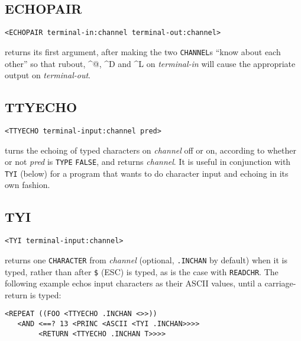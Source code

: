 \documentclass[a4paper]{scrbook}
\begin{document}
\subsection{ECHOPAIR}\label{echopair}

\begin{verbatim}
<ECHOPAIR terminal-in:channel terminal-out:channel>
\end{verbatim}

 returns its first argument, after making the two \texttt{CHANNEL}s ``know about each
other'' so that rubout, \^{}@,  \^{}D  and \^{}L
 on \emph{terminal-in} will cause the appropriate output on \emph{terminal-out}.

\subsection{TTYECHO}\label{ttyecho}

\begin{verbatim}
<TTYECHO terminal-input:channel pred>
\end{verbatim}

 turns the echoing of typed characters on \emph{channel} off or on, according to whether or
not \emph{pred} is \texttt{TYPE} \texttt{FALSE}, and returns \emph{channel}. It is useful in conjunction with \texttt{TYI}
(below) for a program that wants to do character input and echoing in its own fashion.

\subsection{TYI}\label{tyi}

\begin{verbatim}
<TYI terminal-input:channel>
\end{verbatim}

 returns one \texttt{CHARACTER} from \emph{channel} (optional, \texttt{.INCHAN} by default) when
it is typed, rather than after \texttt{\$} \index{\texttt{\$}} (ESC) is typed, as is the case with
\texttt{READCHR}. The following example echos input characters as their ASCII values, until a
carriage-return is typed:

\begin{verbatim}
<REPEAT ((FOO <TTYECHO .INCHAN <>>))
   <AND <==? 13 <PRINC <ASCII <TYI .INCHAN>>>>
        <RETURN <TTYECHO .INCHAN T>>>>
\end{verbatim}
\end{document}
